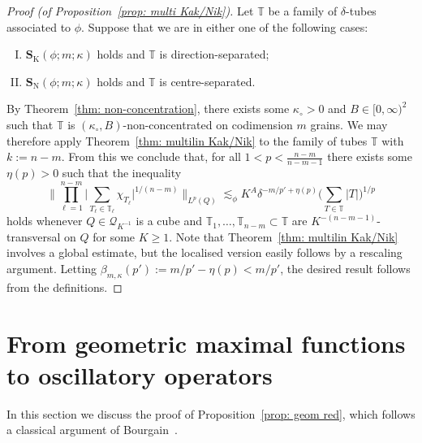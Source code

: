 \documentclass[reqno]{amsart}
\numberwithin{equation}{section}
\newcommand{\T}{\mathbb{T}}
\newcommand{\cQ}{\mathcal{Q}}
\newcommand{\bS}{\mathbf{S}}
\theoremstyle{plain}
\theoremstyle{definition}
\newcommand{\tK}{\mathrm{K}}
\newcommand{\tN}{\mathrm{N}}
\begin{document}
\begin{proof}[Proof (of Proposition~\ref{prop: multi Kak/Nik})] Let $\T$ be a family of $\delta$-tubes associated to $\phi$. Suppose that we are in either one of the following cases:
\begin{enumerate}[I)]
    \item $\bS_{\tK}(\phi;m; \kappa)$ holds and $\T$ is direction-separated; 
    \item $\bS_{\tN}(\phi;m; \kappa)$ holds and $\T$ is centre-separated. 
\end{enumerate}
By Theorem~\ref{thm: non-concentration}, there exists some $\kappa_{\circ} > 0$ and $B \in [0,\infty)^2$ such that $\T$ is $(\kappa_{\circ}, B)$-non-concentrated on codimension $m$ grains. We may therefore apply Theorem~\ref{thm: multilin Kak/Nik} to the family of tubes $\T$ with $k := n - m$. From this we conclude that, for all $1 < p < \frac{n-m}{n-m-1}$ there exists some $\eta(p) > 0$ such that the inequality 
\begin{equation*}
    \Big\|\prod_{\ell = 1}^{n-m} \big| \sum_{T_{\ell} \in \T_{\ell}} \chi_{T_{\ell}} \big|^{1/(n-m)} \Big\|_{L^p(Q)} \lesssim_{\phi} K^A \delta^{-m/p' + \eta(p)} \Big(\sum_{T \in \T} |T| \Big)^{1/p}
\end{equation*}
holds whenever $Q \in \cQ_{K^{-1}}$ is a cube and $\T_1, \dots, \T_{n-m} \subset \T$ are $K^{-(n-m-1)}$-transversal on $Q$ for some $K \geq 1$. Note that Theorem~\ref{thm: multilin Kak/Nik} involves a global estimate, but the localised version easily follows by a rescaling argument. Letting $\beta_{m, \kappa}(p') := m/p' - \eta(p) < m/p'$, the desired result follows from the definitions. 
\end{proof}





\section{From geometric maximal functions to oscillatory operators}\label{sec: geom red}

In this section we discuss the proof of Proposition~\ref{prop: geom red}, which follows a classical argument of Bourgain~\cite{Bourgain1991a, Bourgain1991}. 
\end{document}
